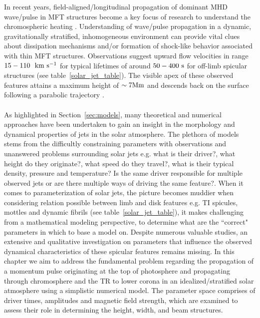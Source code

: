 \documentclass[12pt]{ociamthesis}
\newcommand{\kms}{~\rm{km ~s^{-1}}}
\newcommand{\np}{\\ \\}
\begin{document}
In recent years, field-aligned/longitudinal propagation of dominant MHD wave/pulse in MFT structures become a key focus of research to understand the chromospheric heating \citep{Narain1990, Zaqarashvili_2009SSRv, Jess2015}. Understanding of wave/pulse propagation in a dynamic, gravitationally stratified, inhomogeneous environment can provide vital clues about dissipation mechanisms and/or formation of shock-like behavior associated with thin MFT structures. Observations suggest upward flow velocities in range $15-110 ~\kms$ for typical lifetimes of around $50-400~\rm{s}$ for off-limb spicular structures (see table~\ref{solar_jet_table}). The visible apex of these observed features attains a maximum height of $\sim 7 \rm{Mm}$ and descends back on the surface following a parabolic trajectory \citep{Pereira2012,Pereira2016ApJ82465P}. \np
%
As highlighted in Section~\ref{sec:models}, many theoretical and numerical approaches have been undertaken to gain an insight in the morphology and dynamical properties of jets in the solar atmosphere. The plethora of models stems from the difficultly constraining parameters with observations and unanswered problems surrounding solar jets e.g. what is their driver?, what height do they originate?, what speed do they travel?, what is their typical density, pressure and temperature? Is the same driver responsible for multiple observed jets or are there multiple ways of driving the same feature?. When it comes to parameterization of solar jets, the picture becomes muddier when considering relation possible between limb and disk features e.g. TI spicules, mottles and dynamic fibrils (see table~\ref{solar_jet_table}), it makes challenging from a mathematical modeling perspective, to determine what are the ``correct" parameters in which to base a model on. Despite numerous valuable studies, an extensive and qualitative investigation on parameters that influence the observed dynamical characteristics of these spicular features remains missing. In this chapter we aim to address the fundamental problem regarding the propagation of a momentum pulse originating at the top of photosphere and propagating through chromosphere and the TR to lower corona in an idealized/stratified solar atmosphere using a simplistic numerical model. The parameter space comprises of driver times, amplitudes and magnetic field strength, which are examined to assess their role in determining the height, width, and beam structures.
\end{document}
